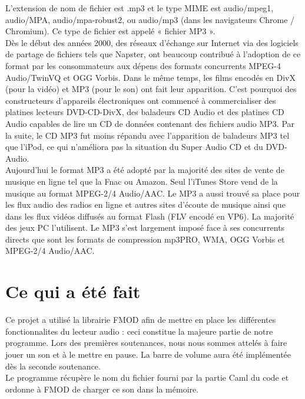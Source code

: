 \documentclass[12pt,a4paper]{report}
\begin{document}
L'extension de nom de fichier est .mp3 et le type MIME est audio/mpeg1, audio/MPA, audio/mpa-robust2, ou audio/mp3 (dans les navigateurs Chrome / Chromium). Ce type de fichier est appelé « fichier MP3 ».\\

Dès le début des années 2000, des réseaux d'échange sur Internet via des logiciels de partage de fichiers tels que Napster, ont beaucoup contribué à l'adoption de ce format par les consommateurs aux dépens des formats concurrents MPEG-4 Audio/TwinVQ et OGG Vorbis. Dans le même temps, les films encodés en DivX (pour la vidéo) et MP3 (pour le son) ont fait leur apparition. C'est pourquoi des constructeurs d'appareils électroniques ont commencé à commercialiser des platines lecteurs DVD-CD-DivX, des baladeurs CD Audio et des platines CD Audio capables de lire un CD de données contenant des fichiers audio MP3. Par la suite, le CD MP3 fut moins répandu avec l'apparition de baladeurs MP3 tel que l'iPod, ce qui n'améliora pas la situation du Super Audio CD et du DVD-Audio.\\

Aujourd'hui le format MP3 a été adopté par la majorité des sites de vente de musique en ligne tel que la Fnac ou Amazon. Seul l'iTunes Store vend de la musique au format MPEG-2/4 Audio/AAC. Le MP3 a aussi trouvé sa place pour les flux audio des radios en ligne et autres sites d'écoute de musique ainsi que dans les flux vidéos diffusés au format Flash (FLV encodé en VP6). La majorité des jeux PC l'utilisent. Le MP3 s'est largement imposé face à ses concurrents directs que sont les formats de compression mp3PRO, WMA, OGG Vorbis et MPEG-2/4 Audio/AAC.\\

\section{Ce qui a été fait}

Ce projet a utilisé la librairie FMOD afin de mettre en place les différentes fonctionnalites du lecteur audio : ceci constitue la majeure partie de notre programme. Lors des premières soutenances, nous nous sommes attelés à faire jouer un son et à le mettre en pause. La barre de volume aura été implémentée dès la seconde soutenance.\\

Le programme récupère le nom du fichier fourni par la partie Caml du code et ordonne à FMOD de charger ce son dans la mémoire.\\
\end{document}
